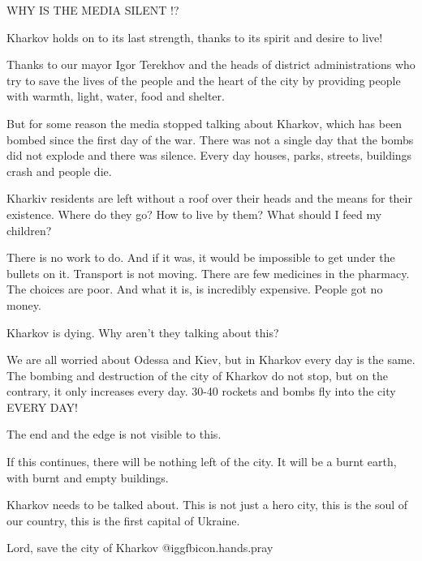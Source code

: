  
 
 
 
 

WHY IS THE MEDIA SILENT !? 

Kharkov holds on to its last strength, thanks to its spirit and desire to live!

Thanks to our mayor Igor Terekhov and the heads of district administrations who
try to save the lives of the people and the heart of the city by providing
people with warmth, light, water, food and shelter.

But for some reason the media stopped talking about Kharkov, which has been
bombed since the first day of the war. There was not a single day that the
bombs did not explode and there was silence. Every day houses, parks, streets,
buildings crash and people die.

Kharkiv residents are left without a roof over their heads and the means for
their existence. Where do they go? How to live by them? What should I feed my
children?

There is no work to do. And if it was, it would be impossible to get under the
bullets on it. Transport is not moving. There are few medicines in the
pharmacy. The choices are poor. And what it is, is incredibly expensive. People
got no money.

Kharkov is dying. Why aren't they talking about this?

We are all worried about Odessa and Kiev, but in Kharkov every day is the same.
The bombing and destruction of the city of Kharkov do not stop, but on the
contrary, it only increases every day. 30-40 rockets and bombs fly into the
city EVERY DAY!

The end and the edge is not visible to this.

If this continues, there will be nothing left of the city. It will be a burnt
earth, with burnt and empty buildings.

Kharkov needs to be talked about. This is not just a hero city, this is the
soul of our country, this is the first capital of Ukraine.

Lord, save the city of Kharkov @igg{fbicon.hands.pray} 🏻
